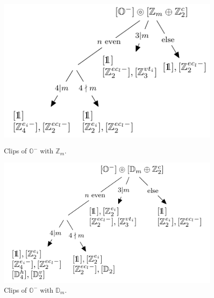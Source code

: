 \documentclass[11pt,a4paper]{amsart}
\theoremstyle{definition}
\newcommand{\ZZ}{\mathbb{Z}}                %
\newcommand{\octa}{\mathbb{O}}              %
\newcommand{\DD}{\mathbb{D}}                %
\newcommand{\1}{\mathds{1}}		            %
\begin{document}
\begin{figure}[h!]
	\begin{minipage}[b]{0.5\linewidth}
		\centering \includegraphics[width=0.7\linewidth]{"Figures piezo/graphe16"}
		\caption{Clips of $\octa^-$ with $\ZZ_m$.}
		\label{fig:graphe16}
	\end{minipage}\hfill
	\begin{minipage}[b]{0.5\linewidth}
		\centering \includegraphics[width=0.8\linewidth]{"Figures piezo/graphe17"}
		\caption{Clips of $\octa^-$ with $\DD_m$.}
		\label{fig:graphe17}
	\end{minipage}
\end{figure}

\newpage



\end{document}

